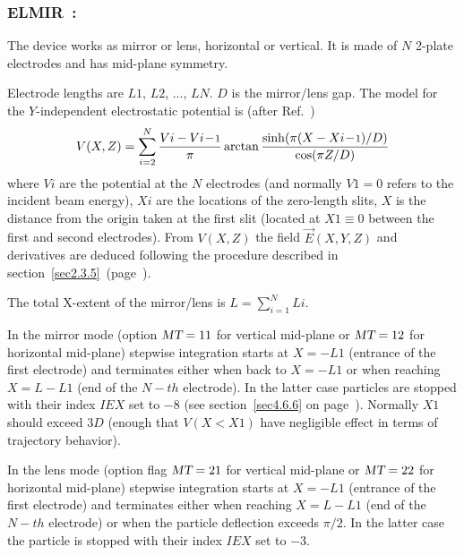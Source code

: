 \vfill

\newpage

\subsubsection*{ELMIR~: \ELMIRTitl }\label{ELMIR}
\medskip

The device works as  mirror or lens, horizontal or vertical. 
It is made of $N$ 2-plate electrodes and has mid-plane symmetry.  
\bigskip

\noindent Electrode lengths are  $ L\!1 $, $ L\!2 $, ...,   $ L\!N$. $D$ is the  mirror/lens gap. 
The model for the $Y$-independent electrostatic potential is (after Ref.~\cite[p.412]{Karets}) 
$$ V(X,Z) = 
   \sum_{i=2}^{N} \dfrac{V{i}-V{i\!-\!\textrm{\footnotesize 1}} }{ \pi} 
     \arctan\dfrac{\sinh(\pi ( X - X{i\!-\!\textrm{\footnotesize 1}})/D)}{\cos(\pi Z/D)}   
$$
where $V\!i$ are the potential at the $N$ electrodes (and normally $V\!1=0$ refers to 
the incident beam energy),   $X\!i$ are the  locations of the zero-length slits, $ X $ is the distance 
from the origin taken at the first slit (located at $X\!1 \equiv 0$ between the first and 
second electrodes).  
 From $V(X,Z) $ the field $ \vec  E(X,Y,Z) $ and derivatives are deduced following the procedure 
described in section~\ref{sec2.3.5}~(page~\pageref{sec2.3.5}).  

\medskip

\noindent The total X-extent of the mirror/lens is $L = \sum_{i=1}^N L\!i$.

\medskip

\noindent In the mirror mode (option  $\textsl{MT}=11$ for vertical mid-plane  or $\textsl{MT}=12$ 
for horizontal mid-plane) stepwise integration starts 
at $X=-L\!1$ (entrance of the first electrode) and terminates either when back to   $X=-L\!1$  
or when  reaching $ X=L-L\!1$ (end of the $N-th$ electrode). 
In the latter case particles  are stopped  with their index
 $I\!E\!X$ set to $-8$ (see section~\ref{sec4.6.6} on page~\pageref{sec4.6.6}). 
Normally $X\!1$ should   exceed  $3D$ (enough that $V(X<X\!1)$   have negligible effect in terms of trajectory behavior).  

\medskip

\noindent In the lens mode (option flag $\textsl{MT}=21$ for vertical mid-plane  or $\textsl{MT}=22$
for horizontal mid-plane) stepwise integration starts
at $X=-L\!1$ (entrance of the first electrode) and terminates either when reaching $ X=L-L\!1$ (end of the $N-th$ electrode) 
or when the particle deflection exceeds $\pi/2$. In the latter case the particle is stopped  with their index
 $I\!E\!X$ set to $-3$. 
 
